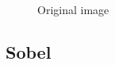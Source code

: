 \begin{figure}[!htb]
\begin{minipage}{0.40\textwidth}
        \caption{Original image}
        \end{minipage}
    \end{figure}


    \pagebreak
    \subsection{Sobel}

